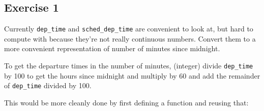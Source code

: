 \documentclass[]{book}
\newenvironment{Shaded}{\begin{snugshade}}{\end{snugshade}}
\newcommand{\CommentTok}[1]{\textcolor[rgb]{0.56,0.35,0.01}{\textit{#1}}}
\newcommand{\DataTypeTok}[1]{\textcolor[rgb]{0.13,0.29,0.53}{#1}}
\newcommand{\DecValTok}[1]{\textcolor[rgb]{0.00,0.00,0.81}{#1}}
\newcommand{\KeywordTok}[1]{\textcolor[rgb]{0.13,0.29,0.53}{\textbf{#1}}}
\newcommand{\NormalTok}[1]{#1}
\newcommand{\OperatorTok}[1]{\textcolor[rgb]{0.81,0.36,0.00}{\textbf{#1}}}
\newcommand{\StringTok}[1]{\textcolor[rgb]{0.31,0.60,0.02}{#1}}
\theoremstyle{plain}
\theoremstyle{remark}
\theoremstyle{definition}
\theoremstyle{definition}
\theoremstyle{definition}
\theoremstyle{remark}
\begin{document}
\hypertarget{exercise-1-9}{%
\subsection{Exercise 1}\label{exercise-1-9}}

Currently \texttt{dep\_time} and \texttt{sched\_dep\_time} are
convenient to look at, but hard to compute with because they're not
really continuous numbers. Convert them to a more convenient
representation of number of minutes since midnight.

To get the departure times in the number of minutes, (integer) divide
\texttt{dep\_time} by 100 to get the hours since midnight and multiply
by 60 and add the remainder of \texttt{dep\_time} divided by 100.

\begin{Shaded}
\end{Shaded}

This would be more cleanly done by first defining a function and reusing
that:
\end{document}
